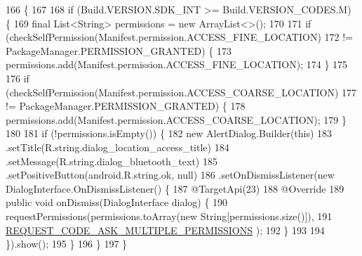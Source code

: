 \begin{DoxyCode}
166                                            \{
167 
168         \textcolor{keywordflow}{if} (Build.VERSION.SDK\_INT >= Build.VERSION\_CODES.M) \{
169             \textcolor{keyword}{final} List<String> permissions = \textcolor{keyword}{new} ArrayList<>();
170 
171             \textcolor{keywordflow}{if} (checkSelfPermission(Manifest.permission.ACCESS\_FINE\_LOCATION)
172                     != PackageManager.PERMISSION\_GRANTED) \{
173                 permissions.add(Manifest.permission.ACCESS\_FINE\_LOCATION);
174             \}
175 
176             \textcolor{keywordflow}{if} (checkSelfPermission(Manifest.permission.ACCESS\_COARSE\_LOCATION)
177                     != PackageManager.PERMISSION\_GRANTED) \{
178                 permissions.add(Manifest.permission.ACCESS\_COARSE\_LOCATION);
179             \}
180 
181             \textcolor{keywordflow}{if} (!permissions.isEmpty()) \{
182                 \textcolor{keyword}{new} AlertDialog.Builder(\textcolor{keyword}{this})
183                         .setTitle(R.string.dialog\_location\_access\_title)
184                         .setMessage(R.string.dialog\_bluetooth\_text)
185                         .setPositiveButton(android.R.string.ok, null)
186                         .setOnDismissListener(\textcolor{keyword}{new} DialogInterface.OnDismissListener() \{
187                             @TargetApi(23)
188                             @Override
189                             \textcolor{keyword}{public} \textcolor{keywordtype}{void} onDismiss(DialogInterface dialog) \{
190                                 requestPermissions(permissions.toArray(\textcolor{keyword}{new} String[permissions.size()]),
191                                         \hyperlink{classit_1_1unibo_1_1torsello_1_1bluetoothpositioning_1_1activities_1_1MainActivity_a319aed5cdd5724e043302babe5fcfeac_a319aed5cdd5724e043302babe5fcfeac}{REQUEST\_CODE\_ASK\_MULTIPLE\_PERMISSIONS}
      );
192                             \}
193 
194                         \}).show();
195             \}
196         \}
197     \}
\end{DoxyCode}
\hypertarget{classit_1_1unibo_1_1torsello_1_1bluetoothpositioning_1_1activities_1_1MainActivity_ab0010b6d3fe518fabfea843626d7b5f1_ab0010b6d3fe518fabfea843626d7b5f1}{}\label{classit_1_1unibo_1_1torsello_1_1bluetoothpositioning_1_1activities_1_1MainActivity_ab0010b6d3fe518fabfea843626d7b5f1_ab0010b6d3fe518fabfea843626d7b5f1} 

